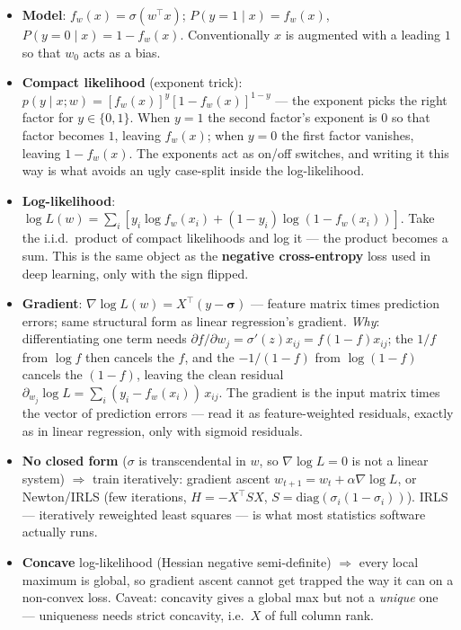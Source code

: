 \documentclass[11pt, a4paper]{article}
\newcommand{\kw}[1]{\textbf{#1}}
\begin{document}
\begin{itemize}
  \item \kw{Model}: $f_w(x)=\sigma(w^\top x)$; $P(y{=}1\mid x)=f_w(x)$, $P(y{=}0\mid x)=1-f_w(x)$.
  Conventionally $x$ is augmented with a leading $1$ so that $w_0$ acts as a bias.
  \item \kw{Compact likelihood} (exponent trick): $p(y\mid x;w)=[f_w(x)]^y[1-f_w(x)]^{1-y}$ — the
  exponent picks the right factor for $y\in\{0,1\}$. When $y=1$ the second factor's exponent is $0$
  so that factor becomes $1$, leaving $f_w(x)$; when $y=0$ the first factor vanishes, leaving
  $1-f_w(x)$. The exponents act as on/off switches, and writing it this way is what avoids an ugly
  case-split inside the log-likelihood.
  \item \kw{Log-likelihood}: $\log L(w)=\sum_i[y_i\log f_w(x_i)+(1-y_i)\log(1-f_w(x_i))]$. Take the
  i.i.d.\ product of compact likelihoods and log it — the product becomes a sum. This is the same
  object as the \kw{negative cross-entropy} loss used in deep learning, only with the sign flipped.
  \item \kw{Gradient}: $\nabla\log L(w)=X^\top(y-\boldsymbol\sigma)$ — feature matrix times prediction
  errors; same structural form as linear regression's gradient. \emph{Why}: differentiating one term
  needs $\partial f/\partial w_j=\sigma'(z)x_{ij}=f(1-f)x_{ij}$; the $1/f$ from $\log f$ then cancels
  the $f$, and the $-1/(1-f)$ from $\log(1-f)$ cancels the $(1-f)$, leaving the clean residual
  $\partial_{w_j}\log L=\sum_i(y_i-f_w(x_i))\,x_{ij}$. The gradient is the input matrix times the
  vector of prediction errors — read it as feature-weighted residuals, exactly as in linear
  regression, only with sigmoid residuals.
  \item \kw{No closed form} ($\sigma$ is transcendental in $w$, so $\nabla\log L=0$ is not a linear
  system) $\Rightarrow$ train iteratively: gradient ascent $w_{t+1}=w_t+\alpha\nabla\log L$, or
  Newton/IRLS (few iterations, $H=-X^\top S X$, $S=\text{diag}(\sigma_i(1-\sigma_i))$). IRLS —
  iteratively reweighted least squares — is what most statistics software actually runs.
  \item \kw{Concave} log-likelihood (Hessian negative semi-definite) $\Rightarrow$ every local
  maximum is global, so gradient ascent cannot get trapped the way it can on a non-convex loss.
  Caveat: concavity gives a global max but not a \emph{unique} one — uniqueness needs strict
  concavity, i.e.\ $X$ of full column rank.
\end{itemize}
\end{document}
